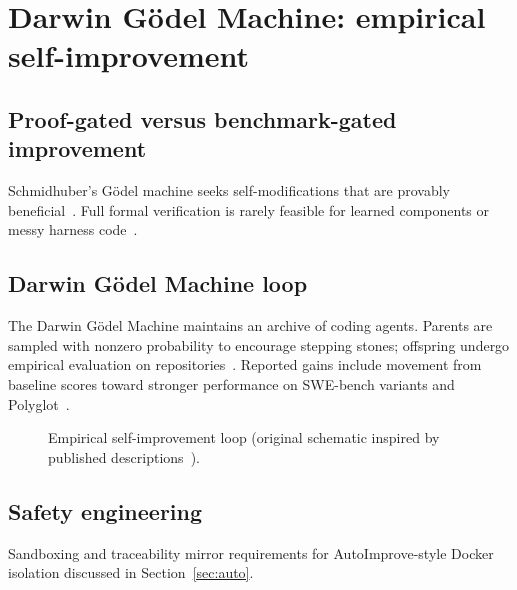 \section{Darwin G\"odel Machine: empirical self-improvement}
\label{sec:dgm}

\subsection{Proof-gated versus benchmark-gated improvement}
Schmidhuber's G\"odel machine seeks self-modifications that are provably beneficial~\cite{schmidhuber2007godel}.
Full formal verification is rarely feasible for learned components or messy harness code~\cite{zhang2025darwin}.

\subsection{Darwin G\"odel Machine loop}
The Darwin G\"odel Machine maintains an archive of coding agents.
Parents are sampled with nonzero probability to encourage stepping stones; offspring undergo empirical evaluation on repositories~\cite{zhang2025darwin}.
Reported gains include movement from baseline scores toward stronger performance on SWE-bench variants and Polyglot~\cite{zhang2025darwin,jimenez2024swebench}.

\begin{figure}[t]
  \centering
  
  \caption{Empirical self-improvement loop (original schematic inspired by published descriptions~\cite{zhang2025darwin}).}
  \label{fig:dgm}
\end{figure}

\subsection{Safety engineering}
Sandboxing and traceability mirror requirements for AutoImprove-style Docker isolation discussed in Section~\ref{sec:auto}.
